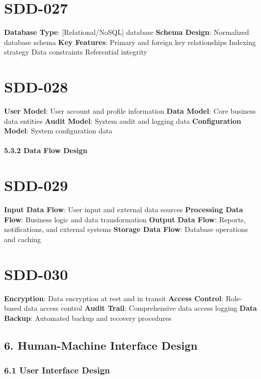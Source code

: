\section{SDD-027}\label{SDD-027}

\textbf{Database Type}: [Relational/NoSQL] database
\textbf{Schema Design}: Normalized database schema
\textbf{Key Features}:
Primary and foreign key relationships
Indexing strategy
Data constraints
Referential integrity

\section{SDD-028}\label{SDD-028}

\textbf{User Model}: User account and profile information
\textbf{Data Model}: Core business data entities
\textbf{Audit Model}: System audit and logging data
\textbf{Configuration Model}: System configuration data

\paragraph{5.3.2 Data Flow Design}

\section{SDD-029}\label{SDD-029}

\textbf{Input Data Flow}: User input and external data sources
\textbf{Processing Data Flow}: Business logic and data transformation
\textbf{Output Data Flow}: Reports, notifications, and external systems
\textbf{Storage Data Flow}: Database operations and caching

\section{SDD-030}\label{SDD-030}

\textbf{Encryption}: Data encryption at rest and in transit
\textbf{Access Control}: Role-based data access control
\textbf{Audit Trail}: Comprehensive data access logging
\textbf{Data Backup}: Automated backup and recovery procedures

\subsection{6. Human-Machine Interface Design}

\subsubsection{6.1 User Interface Design}

